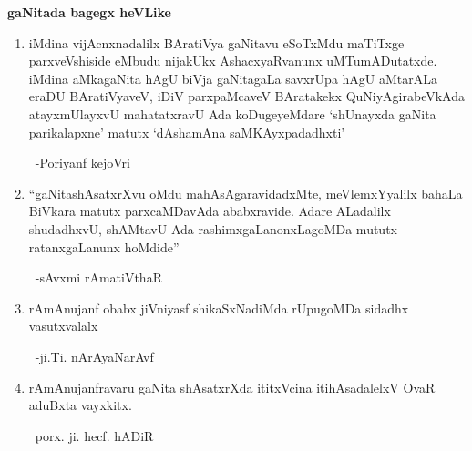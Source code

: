 \begin{center}
{\bf gaNitada bagegx heVLike} 
\end{center}
\begin{enumerate}[\rm 1)]
\item iMdina vijAcnxnadalilx BAratiVya gaNitavu eSoTxMdu maTiTxge parxveVshiside eMbudu nijakUkx AshacxyaRvanunx uMTumADutatxde. iMdina aMkagaNita hAgU biVja gaNitagaLa savxrUpa hAgU aMtarALa eraDU BAratiVyaveV, iDiV parxpaMcaveV BAratakekx QuNiyAgirabeVkAda atayxmUlayxvU mahatatxravU Ada koDugeyeMdare `shUnayxda gaNita parikalapxne' matutx `dAshamAna saMKAyxpadadhxti'

~\hfill -Poriyanf kejoVri

\vfill\eject
\item ``gaNitashAsatxrXvu oMdu mahAsAgaravidadxMte, meVlemxYyalilx bahaLa BiVkara matutx parxcaMDavAda ababxravide. Adare ALadalilx shudadhxvU, shAMtavU Ada rashimxgaLanonxLagoMDa mututx ratanxgaLanunx hoMdide''

~\hfill -sAvxmi rAmatiVthaR

\item rAmAnujanf obabx jiVniyasf shikaSxNadiMda rUpugoMDa sidadhx vasutxvalalx 

~\hfill -ji.Ti. nArAyaNarAvf

\item rAmAnujanfravaru gaNita shAsatxrXda ititxVcina itihAsadalelxV OvaR aduBxta vayxkitx. 

~\hfill porx. ji. hecf. hADiR 
\end{enumerate}
